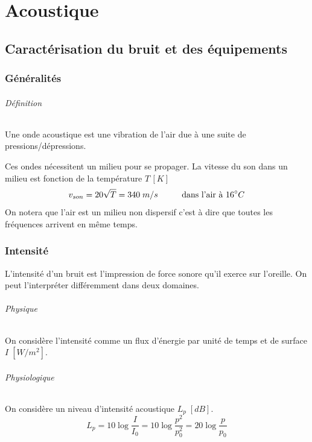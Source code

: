 \documentclass[11pt]{report}
\begin{document}
\part{Acoustique}
\chapter{Caractérisation du bruit et des équipements}
\section{Généralités}
\paragraph{Définition} Une onde acoustique est une vibration de l'air due à une suite de pressions/dépressions.

Ces ondes nécessitent un milieu pour se propager. La vitesse du son dans un milieu est fonction de la température $T\,[K]$
$$v_{son} = 20 \sqrt{T} = 340 \;m/s\hspace{1cm} \textup{dans l'air à 16}^{\circ}C$$
On notera que l'air est un milieu non dispersif c'est à dire que toutes les fréquences arrivent en même temps.

\section{Intensité}
L'intensité d'un bruit est l'impression de force sonore qu'il exerce sur l'oreille. On peut l'interpréter différemment dans deux domaines.

\paragraph{Physique} On considère l'intensité comme un flux d'énergie par unité de temps et de surface $I\;[W/m^2]$.

\paragraph{Physiologique} On considère un niveau d'intensité acoustique $L_p\;[dB]$.
$$L_p = 10 \log \frac{I}{I_0} = 10 \log \frac{p^2}{p^2_0} = 20 \log \frac{p}{p_0} $$
\end{document}
